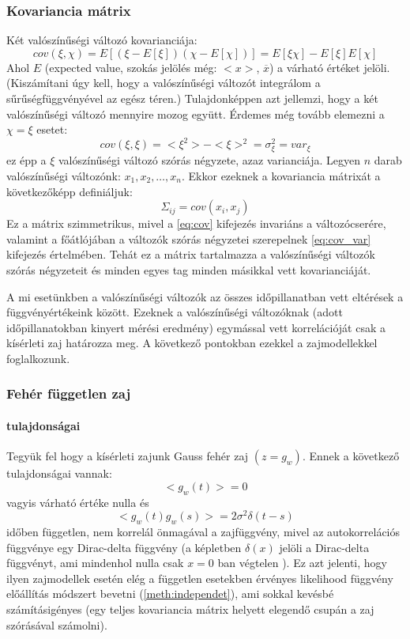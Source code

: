 \subsubsection{Kovariancia mátrix}
Két valószínűségi változó kovarianciája:
\begin{equation}\label{eq:cov}
	cov(\xi,\chi) = E\left[(\xi-E[\xi])(\chi-E[\chi])\right] = E[\xi\chi] - E[\xi]E[\chi]
\end{equation}
Ahol $E$ (expected value, szokás jelölés még: $<x>$, $\overline{x}$) a várható értéket jelöli. (Kiszámítani úgy kell, hogy a valószínűségi változót integrálom a sűrűségfüggvényével az egész téren.) Tulajdonképpen azt jellemzi, hogy a két valószínűségi változó mennyire mozog együtt. Érdemes még tovább elemezni a $\chi=\xi$ esetet:
\begin{equation}\label{eq:cov_var}
	cov(\xi,\xi) = <\xi^2> - <\xi>^2 = \sigma_\xi^2 = var_\xi
\end{equation}
ez épp a $\xi$ valószínűségi változó szórás négyzete, azaz varianciája. 
Legyen $n$ darab valószínűségi változónk: $x_1, x_2, \ldots , x_n$. Ekkor ezeknek a kovariancia mátrixát a következőképp definiáljuk:
\begin{equation}\label{eq:covmat}
	\Sigma_{ij} = cov(x_i, x_j)
\end{equation}
Ez a mátrix szimmetrikus, mivel a \ref{eq:cov} kifejezés invariáns a változócserére, valamint a főátlójában a változók szórás négyzetei szerepelnek \ref{eq:cov_var} kifejezés értelmében. Tehát ez a mátrix tartalmazza a valószínűségi változók szórás négyzeteit és minden egyes tag minden másikkal vett kovarianciáját.

A mi esetünkben a valószínűségi változók az összes időpillanatban vett eltérések a függvényértékeink között. Ezeknek a valószínűségi változóknak (adott időpillanatokban kinyert mérési eredmény) egymással vett korrelációját csak a kísérleti zaj határozza meg. A következő pontokban ezekkel a zajmodellekkel foglalkozunk.

\subsubsection{Fehér független zaj}
\paragraph{tulajdonságai}
Tegyük fel hogy a kísérleti zajunk Gauss fehér zaj $(z = g_w)$. Ennek a következő tulajdonságai vannak:
\begin{equation}
	<g_w(t)> = 0
\end{equation}
vagyis várható értéke nulla és
\begin{equation}
	<g_w(t)g_w(s)> = 2\sigma^2\delta(t-s)
\end{equation}
időben független, nem korrelál önmagával a zajfüggvény, mivel az autokorrelációs függvénye egy Dirac-delta függvény (a képletben $\delta(x)$ jelöli a Dirac-delta függvényt, ami mindenhol nulla csak $x=0$ ban végtelen ). Ez azt jelenti, hogy ilyen zajmodellek esetén elég a független esetekben érvényes likelihood függvény előállítás módszert bevetni (\ref{meth:independet}), ami sokkal kevésbé számításigényes (egy teljes kovariancia mátrix helyett elegendő csupán a zaj szórásával számolni).


